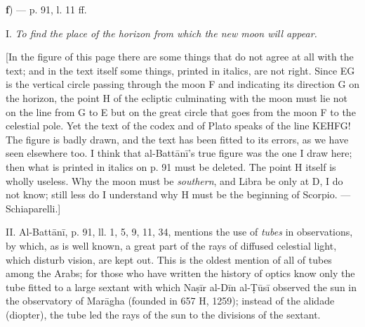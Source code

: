 \documentclass[11pt]{article}
\newcommand{\Pg}[1]{\marginpar{\footnotesize\color{gray}#1}}
\begin{document}
\par [«\emph{The space between the two arcs is the image of the new moon}». — The author's construction gives the inclination of the line of the horns with respect to the ecliptic quite exactly, at least as long as the difference of longitude between the sun and the moon does not become much greater than the difference usually found on the day of the first appearance. It must also be noted that GT is the \emph{true breadth of the visible lune} of the moon, not the breadth of the \emph{crescent}, which is much thinner than the lune, for there the lunar surface is seen under great obliquity. So the words «is the image of the new moon» must be understood. Better below, p. 90, ll. 18–19: «The line TG will be … the amount of the digits of the light of the moon». — Schiaparelli.]\par
\par\begin{center}\textbf{f}) — p. 91, l. 11 ff.\end{center}
\par I. \emph{To find the place of the horizon from which the new moon will appear.}\par
\par \Pg{I 272}[In the figure of this page there are some things that do not agree at all with the text; and in the text itself some things, printed in italics, are not right. Since EG is the vertical circle passing through the moon F and indicating its direction G on the horizon, the point H of the ecliptic culminating with the moon must lie not on the line from G to E but on the great circle that goes from the moon F to the celestial pole. Yet the text of the codex and of Plato speaks of the line KEHFG! The figure is badly drawn, and the text has been fitted to its errors, as we have seen elsewhere too. I think that al-Battānī's true figure was the one I draw here; then what is printed in italics on p. 91 must be deleted. The point H itself is wholly useless. Why the moon must be \emph{southern}, and Libra be only at D, I do not know; still less do I understand why H must be the beginning of Scorpio. — Schiaparelli.]\par
\begin{center}\end{center}
\par II. Al-Battānī, p. 91, ll. 1, 5, 9, 11, 34, mentions the use of \emph{tubes} in observations, by which, as is well known, a great part of the rays of diffused celestial light, which disturb vision, are kept out. This is the oldest mention of all of tubes among the Arabs; for those who have written the history of optics know only the tube fitted to a large sextant with which Naṣīr al-Dīn al-Ṭūsī observed the sun in the observatory of Marāgha (founded in 657 H, 1259); instead of the alidade (diopter), the tube led the rays of the sun to the divisions of the sextant.\par
\end{document}
